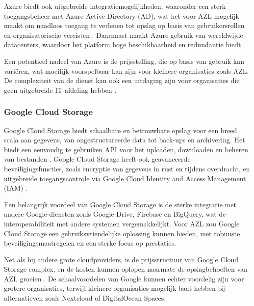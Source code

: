 Azure biedt ook uitgebreide integratiemogelijkheden, waaronder een sterk toegangsbeheer met Azure Active Directory (AD), wat het voor AZL mogelijk maakt om naadloos toegang te verlenen tot opslag op basis van gebruikersrollen en organisatorische vereisten \autocite{azure_ad}. Daarnaast maakt Azure gebruik van wereldwijde datacenters, waardoor het platform hoge beschikbaarheid en redundantie biedt.

Een potentieel nadeel van Azure is de prijsstelling, die op basis van gebruik kan variëren, wat moeilijk voorspelbaar kan zijn voor kleinere organisaties zoals AZL. De complexiteit van de dienst kan ook een uitdaging zijn voor organisaties die geen uitgebreide IT-afdeling hebben \autocite{azure_pricing}.

\subsubsection{Google Cloud Storage}
Google Cloud Storage biedt schaalbare en betrouwbare opslag voor een breed scala aan gegevens, van ongestructureerde data tot back-ups en archivering. Het biedt een eenvoudig te gebruiken API voor het uploaden, downloaden en beheren van bestanden \autocite{google_storage}. Google Cloud Storage heeft ook geavanceerde beveiligingsfuncties, zoals encryptie van gegevens in rust en tijdens overdracht, en uitgebreide toegangscontrole via Google Cloud Identity and Access Management (IAM) \autocite{google_iam}.

Een belangrijk voordeel van Google Cloud Storage is de sterke integratie met andere Google-diensten zoals Google Drive, Firebase en BigQuery, wat de interoperabiliteit met andere systemen vergemakkelijkt. Voor AZL zou Google Cloud Storage een gebruiksvriendelijke oplossing kunnen bieden, met robuuste beveiligingsmaatregelen en een sterke focus op prestaties.

Net als bij andere grote cloudproviders, is de prijsstructuur van Google Cloud Storage complex, en de kosten kunnen oplopen naarmate de opslagbehoeften van AZL groeien \autocite{google_pricing}. De schaalvoordelen van Google kunnen echter voordelig zijn voor grotere organisaties, terwijl kleinere organisaties mogelijk baat hebben bij alternatieven zoals Nextcloud of DigitalOcean Spaces.



